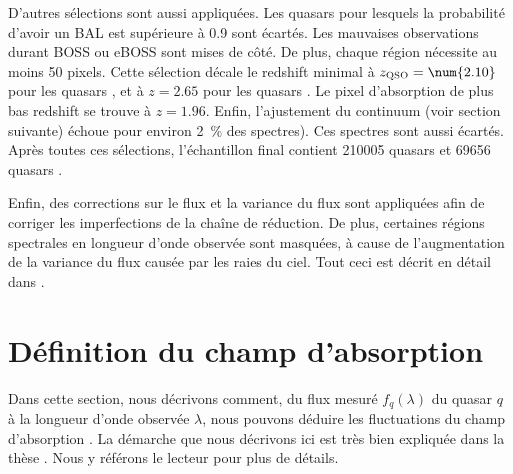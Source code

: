 D'autres sélections sont aussi appliquées. Les quasars pour lesquels la probabilité d'avoir un BAL est supérieure à 0.9 sont écartés. Les mauvaises observations durant BOSS ou eBOSS sont mises de côté. De plus, chaque région nécessite au moins 50 pixels. Cette sélection décale le redshift minimal à $z_{\textsc{QSO}} = \num{2.10}$ pour les quasars \lya{}, et à $z = \num{2.65}$ pour les quasars \lyb{}. Le pixel d'absorption \lya{} de plus bas redshift se trouve à $z = \num{1.96}$. Enfin, l'ajustement du continuum (voir section suivante) échoue pour environ \SI{2}{\percent} des spectres). Ces spectres sont aussi écartés.
Après toutes ces sélections, l'échantillon final contient \num{210005} quasars \lya{} et \num{69656} quasars \lyb{}. 

Enfin, des corrections sur le flux et la variance du flux sont appliquées afin de corriger les imperfections de la chaîne de réduction. De plus, certaines régions spectrales en longueur d'onde observée sont masquées, à cause de l'augmentation de la variance du flux causée par les raies du ciel. Tout ceci est décrit en détail dans \textcite{DuMasdesBourboux2020}.

\section{Définition du champ d'absorption}
Dans cette section, nous décrivons comment, du flux mesuré $f_q(\lambda)$ du quasar $q$ à la longueur d'onde observée $\lambda$, nous pouvons déduire les fluctuations du champ d'absorption \lya{}.
La démarche que nous décrivons ici est très bien expliquée dans la thèse \textcite{DeSainteAgathe}. Nous y référons le lecteur pour plus de détails.

